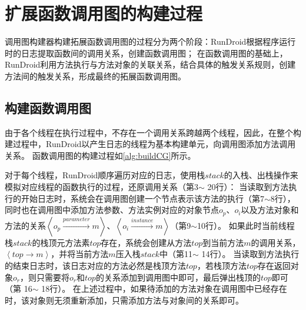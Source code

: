 \section{扩展函数调用图的构建过程}

调用图构建器构建拓展函数调用图的过程分为两个阶段：RunDroid根据程序运行时的日志提取函数间的调用关系，创建函数调用图；
在函数调用图的基础上，RunDroid利用方法执行与方法对象的关联关系，结合具体的触发关系规则，创建方法间的触发关系，形成最终的拓展函数调用图。

\subsection{构建函数调用图}


由于各个线程在执行过程中，不存在一个调用关系跨越两个线程，因此，在整个构建过程中，RunDroid以产生日志的线程为基本构建单元，向调用图添加方法调用关系。
函数调用图的构建过程如\autoref{alg:buildCG}所示。

对于每个线程，RunDroid顺序遍历对应的日志，使用栈$stack$的入栈、出栈操作来模拟对应线程的函数执行的过程，还原调用关系（第3$\sim$ 20行）：
当读取到方法执行的开始日志时，系统会在调用图创建一个节点表示该方法的执行（第7$\sim$8行），
同时也在调用图中添加方法参数、方法实例对应的对象节点$o_p$、$o_i$以及方法对象和方法的关系$ \left\langle  o_p \stackrel{parameter}{\longrightarrow}   m \right\rangle   $、$ \left\langle   o_i \stackrel{instance}{\longrightarrow}   m \right\rangle  $（第9$\sim$10行）。
如果此时当前线程栈$stack$的栈顶元方法素$top$存在，系统会创建从方法$top$到当前方法$m$的调用关系，$\left\langle top \to m \right \rangle  $，并将当前方法$m$压入栈$stack$中（第11$\sim$ 14行）。
当读取到方法执行的结束日志时，该日志对应的方法必然是栈顶方法$top$，若栈顶方法$top$存在返回对象$o_r$，则只需要将$o_r$和$top$的关系添加到调用图中即可，最后弹出栈顶的$top$即可（第 16$\sim$ 18行）。
在上述过程中，如果待添加的方法对象在调用图中已经存在时，该对象则无须重新添加，只需添加方法与对象间的关系即可。



